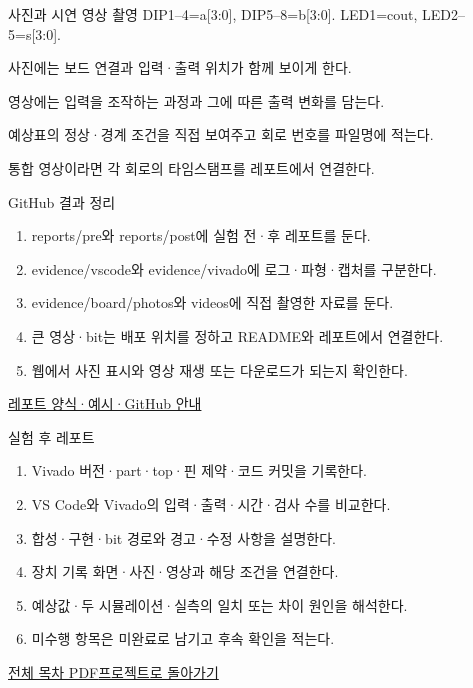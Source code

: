 \begin{frame}{사진과 시연 영상 촬영}\relax
\small
DIP1–4=a[3:0], DIP5–8=b[3:0]. LED1=cout, LED2–5=s[3:0].\par\vspace{0.22cm}사진에는 보드 연결과 입력·출력 위치가 함께 보이게 한다.\par\vspace{0.22cm}영상에는 입력을 조작하는 과정과 그에 따른 출력 변화를 담는다.\par\vspace{0.22cm}예상표의 정상·경계 조건을 직접 보여주고 회로 번호를 파일명에 적는다.\par\vspace{0.22cm}통합 영상이라면 각 회로의 타임스탬프를 레포트에서 연결한다.\par
\end{frame}

\begin{frame}{GitHub 결과 정리}\relax
\small
\begin{enumerate}\setlength{\itemsep}{0.22cm}
\item reports/pre와 reports/post에 실험 전·후 레포트를 둔다.
\item evidence/vscode와 evidence/vivado에 로그·파형·캡처를 구분한다.
\item evidence/board/photos와 videos에 직접 촬영한 자료를 둔다.
\item 큰 영상·bit는 배포 위치를 정하고 README와 레포트에서 연결한다.
\item 웹에서 사진 표시와 영상 재생 또는 다운로드가 되는지 확인한다.
\end{enumerate}
\href{https://github.com/Glaysia/ece2_26_2_2/blob/daily/0910/example/fpga_projects_hdl/LAB1/docs/reports.md}{레포트 양식·예시·GitHub 안내}
\end{frame}

\begin{frame}{실험 후 레포트}\relax
\small
\begin{enumerate}\setlength{\itemsep}{0.22cm}
\item Vivado 버전·part·top·핀 제약·코드 커밋을 기록한다.
\item VS Code와 Vivado의 입력·출력·시간·검사 수를 비교한다.
\item 합성·구현·bit 경로와 경고·수정 사항을 설명한다.
\item 장치 기록 화면·사진·영상과 해당 조건을 연결한다.
\item 예상값·두 시뮬레이션·실측의 일치 또는 차이 원인을 해석한다.
\item 미수행 항목은 미완료로 남기고 후속 확인을 적는다.
\end{enumerate}
\href{04.LAB1_00_CONTENTS.pdf}{전체 목차 PDF}\quad\href{https://github.com/Glaysia/fpga-lab-example-vivado-2026-1-03-adder4/tree/08543696c146164de20930270b01bfbd12ccdd72}{프로젝트로 돌아가기}
\end{frame}
\endgroup

